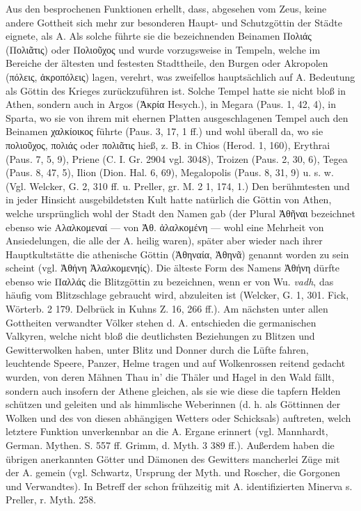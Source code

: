 \documentclass[a4paper, 11pt, oneside]{article}
\begin{document}
Aus den besprochenen Funktionen erhellt, dass, abgesehen vom Zeus, keine andere Gottheit sich mehr zur besonderen Haupt- und Schutzgöttin der Städte eignete, als A. Als solche führte sie die bezeichnenden Beinamen Πολιάς (Πολιᾶτις) oder Πολιοῦχος und wurde vorzugsweise in Tempeln, welche im Bereiche der ältesten und festesten Stadttheile, den Burgen oder Akropolen (πόλεις, ἀκροπόλεις) lagen, verehrt, was zweifellos hauptsächlich auf A. Bedeutung als Göttin des Krieges zurückzuführen ist. Solche Tempel hatte sie nicht bloß in Athen, sondern auch in Argos (Ἀκρία Hesych.), in Megara (Paus. 1, 42, 4), in Sparta, wo sie von ihrem mit ehernen Platten ausgeschlagenen Tempel auch den Beinamen χαλκίοικος führte (Paus. 3, 17, 1 ff.) und wohl überall da, wo sie πολιοῦχος, πολιάς oder πολιᾶτις hieß, z. B. in Chios (Herod. 1, 160), Erythrai (Paus. 7, 5, 9), Priene (C. I. Gr. 2904 vgl. 3048), Troizen (Paus. 2, 30, 6), Tegea (Paus. 8, 47, 5), Ilion (Dion. Hal. 6, 69), Megalopolis (Paus. 8, 31, 9) u. s. w. (Vgl. Welcker, G. 2, 310 ff. u. Preller, gr. M. 2 1, 174, 1.) Den berühmtesten und in jeder Hinsicht ausgebildetsten Kult hatte natürlich die Göttin von Athen, welche ursprünglich wohl der Stadt den Namen gab (der Plural Ἀθῆναι bezeichnet ebenso wie Αλαλκομεναί --- von Ἀθ. ἀλαλκομένη --- wohl eine Mehrheit von Ansiedelungen, die alle der A. heilig waren), später aber wieder nach ihrer Hauptkultstätte die athenische Göttin (Ἀθηναία, Ἀθηνᾶ) genannt worden zu sein scheint (vgl. Ἀθήνη Ἀλαλκομενηίς). Die älteste Form des Namens Ἀθήνη dürfte ebenso wie Παλλάς die Blitzgöttin zu bezeichnen, wenn er von Wu. \emph{vadh}, das häufig vom Blitzschlage gebraucht wird, abzuleiten ist (Welcker, G. 1, 301. Fick, Wörterb. 2 179. Delbrück in Kuhns Z. 16, 266 ff.). Am nächsten unter allen Gottheiten verwandter Völker stehen d. A. entschieden die germanischen Valkyren, welche nicht bloß die deutlichsten Beziehungen zu Blitzen und Gewitterwolken haben, unter Blitz und Donner durch die Lüfte fahren, leuchtende Speere, Panzer, Helme tragen und auf Wolkenrossen reitend gedacht wurden, von deren Mähnen Thau in' die Thäler und Hagel in den Wald fällt, sondern auch insofern der Athene gleichen, als sie wie diese die tapfern Helden schützen und geleiten und als himmlische Weberinnen (d. h. als Göttinnen der Wolken und des von diesen abhängigen Wetters oder Schicksals) auftreten, welch letztere Funktion unverkennbar an die A. Ergane erinnert (vgl. Mannhardt, German. Mythen. S. 557 ff. Grimm, d. Myth. 3 389 ff.). Außerdem haben die übrigen anerkannten Götter und Dämonen des Gewitters mancherlei Züge mit der A. gemein (vgl. Schwartz, Ursprung der Myth. und Roscher, die Gorgonen und Verwandtes). In Betreff der schon frühzeitig mit A. identifizierten Minerva s. Preller, r. Myth. 258.
\end{document}
